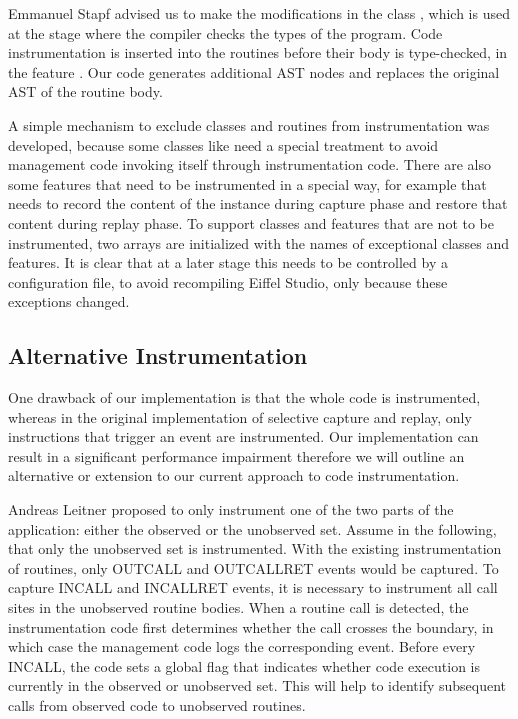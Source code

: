Emmanuel Stapf advised us to make the modifications in the class , which is used at the stage where the compiler checks the types of the program. Code instrumentation is inserted into the routines before their body is type-checked, in the feature . Our code generates additional AST nodes and replaces the original AST of the routine body.

A simple mechanism to exclude classes and routines from instrumentation was developed, because some classes like  need a special treatment to avoid management code invoking itself through instrumentation code. There are also some features that need to be instrumented in a special way, for example  that needs to record the content of the instance during capture phase and restore that content during replay phase. To support classes and features that are not to be instrumented, two arrays are initialized with the names of exceptional classes and features. It is clear that at a later stage this needs to be controlled by a configuration file, to avoid recompiling Eiffel Studio, only because these exceptions changed.


\subsection{Alternative Instrumentation}
\label{lbl:single-sided_instrumentation}
One drawback of our implementation is that the whole code is instrumented, whereas in the original implementation of selective capture and replay, only instructions that trigger an event are instrumented. Our implementation can result in a significant performance impairment therefore we will outline an alternative or extension to our current approach to code instrumentation.

Andreas Leitner proposed to only instrument one of the two parts of the application: either the observed or the unobserved set. Assume in the following, that only the unobserved set is instrumented. With the existing instrumentation of routines, only OUTCALL and OUTCALLRET events would be captured. To capture INCALL and INCALLRET events, it is necessary to instrument all call sites in the unobserved routine bodies. When a routine call is detected, the instrumentation code first determines whether the call crosses the boundary, in which case the management code logs the corresponding event. Before every INCALL, the code sets a global flag that indicates whether code execution is currently in the observed or unobserved set. This will help to identify subsequent calls from observed code to unobserved routines.


